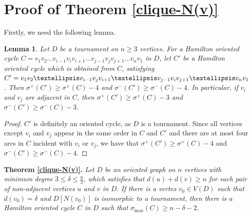 \documentclass[11pt]{article}
\newtheorem{lemma}[theorem]{Lemma}
\newcommand{\QGr}[1]{{#1}}
\newcommand{\QG}[1]{{#1}}
\newcommand{\2}{\vspace{0.2cm}}
\begin{document}
\section{Proof of Theorem \ref{clique-N(v)}}\label{sec:clique-N(v)}
  Firstly, we need the following lemma.

    \begin{lemma}\label{exchange vertices}
        Let $D$ be a tournament on $n\ge 3$ vertices. For a Hamilton oriented cycle $C=v_1 v_2 \dots v_{i-1}v_i v_{i+1}\dots v_{j-1}v_j v_{j+1}\dots v_n v_1$ in $D$, \QG{let $C'$  be a Hamilton oriented cycle which is obtained from $C$, satisfying $C'=v_1 v_2\dots v_{i-1}v_j v_{i+1}\dots v_{j-1} v_i v_{j+1}\dots\\ v_n v_1$.} %
        Then $\sigma^+(C') \ge \sigma^+(C)-4$ and $\sigma^-(C') \ge \sigma^-(C)-4$. In particular, if $v_i$ and $v_j$ are adjacent in $C$, then $\sigma^+(C') \ge \sigma^+(C) - 3$ and $\sigma^-(C') \ge \sigma^-(C) - 3$.
    \end{lemma}

    \begin{proof}
       \QG{$C'$ is definitely an oriented cycle, as $D$ is a tournament. Since all vertices except $v_i$ and $v_j$ appear in the same order in $C$ and $C'$ and there are at most four arcs in $C$ incident with $v_i$ or $v_j$, we have that $\sigma^+(C') \ge \sigma^+(C)-4$ and $\sigma^-(C') \ge \sigma^-(C)-4$.}
    \end{proof}

   \QG{\noindent\textbf{Theorem \ref{clique-N(v)}.} \textit{Let $D$ be an oriented graph on $n$ vertices with minimum degree $3 \le \delta \le \frac{n}{3}$, which satisfies \QGr{that $d(u)+d(v)\ge n$ for each pair of non-adjacent vertices $u$ and $v$ in $D$}. If there is a vertex $v_0 \in V(D)$ such that $d(v_0)=\delta$ and $D[N(v_0)]$ is isomorphic to a tournament, then there is a Hamilton oriented cycle $C$ in $D$ such that $\sigma_{\max}(C) \ge n-\delta-2$.}}
\end{document}
